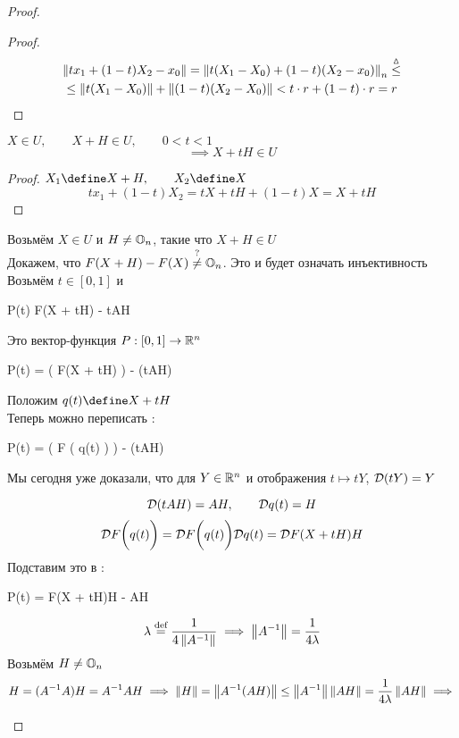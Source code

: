 \begin{proof}
\begin{enumerate}
\begin{remark}
		\end{remark}
		\begin{proof}
			\begin{multline*}
				\left\|{tx_1 + (1 - t)X_2 - x_0}\right\| = \left\|{t(X_1 - X_0) + (1 - t)(X_2 - x_0)}\right\|_n \stackrel\vartriangle\le \\
				\le \left\|{t(X_1 - X_0)}\right\| + \left\|{(1 - t)(X_2 - X_0)}\right\| < t \cdot r + (1 - t) \cdot r = r
			\end{multline*}
		\end{proof}
		\begin{implication}
			$ X \in U, \qquad X + H \in U, \qquad 0 < t < 1 $
			$$ \implies X + tH \in U $$
		\end{implication}
		\begin{proof}
			$ X_1 \define X + H, \qquad X_2 \define X $
			$$ tx_1 + (1 - t)X_2 = tX + tH + (1 - t)X = X + tH $$
		\end{proof}
		Возьмём $ X \in U $ и $ H \ne \mathbb{O}_{n} $, такие что $ X + H \in U $ \\
		Докажем, что $ F(X + H) - F(X) \stackrel?\ne \mathbb{O}_{n} $. Это и будет означать инъективность \\
		Возьмём $ t \in [0, 1] $ и
		\begin{equ}{25}
			P(t)  F(X + tH) - tAH
		\end{equ}
		Это вектор-функция $ P : [0, 1] \to \mathbb{R}^n $
		\begin{equ}{26}
			\mc{D}P(t) =  \bigg( F(X + tH) \bigg) - \mc{D}(tAH)
		\end{equ}
		Положим $ q(t) \define X + tH $ \\
		Теперь можно переписать \eref{26}:
		\begin{equ}{27}
			P(t) =  \bigg( F \big( q(t) \big) \bigg) - \mc{D}(tAH)
		\end{equ}
		\begin{remind}
			Мы сегодня уже доказали, что для $ Y \in \mathbb{R}^n $ и отображения $ t \mapsto tY $, $ \mathcal{D}(tY) = Y $
		\end{remind}
		$$ \mathcal{D}(tAH) = AH, \qquad \mathcal{D}q(t) = H $$
		$$ \mathcal{D}F \bigg( q(t) \bigg) = \mathcal{D}F \bigg( q(t) \bigg)\mathcal{D}q(t) = \mathcal{D}F(X + tH)H $$
		Подставим это в \eref{27}:
		\begin{equ}{28}
			\mc{D}P(t) = F(X + tH)H - AH
		\end{equ}
		$$ \lambda \stackrel{\text{def}}{=} \frac1{4\left\|{A^{-1}}\right\|} \implies \left\|{A^{-1}}\right\| = \frac1{4\lambda} $$
		Возьмём $ H \ne \mathbb{O}_{n} $
		\begin{multline}\lbl{29}
			H = (A^{-1}A)H = A^{-1}AH \implies \norm{H} = \norm{A^{-1}(AH)} \le \norm{A^{-1}}\norm{AH} = \frac1{4\lambda}\norm{AH} \implies \\

\end{multline}
\end{enumerate}
\end{proof}
